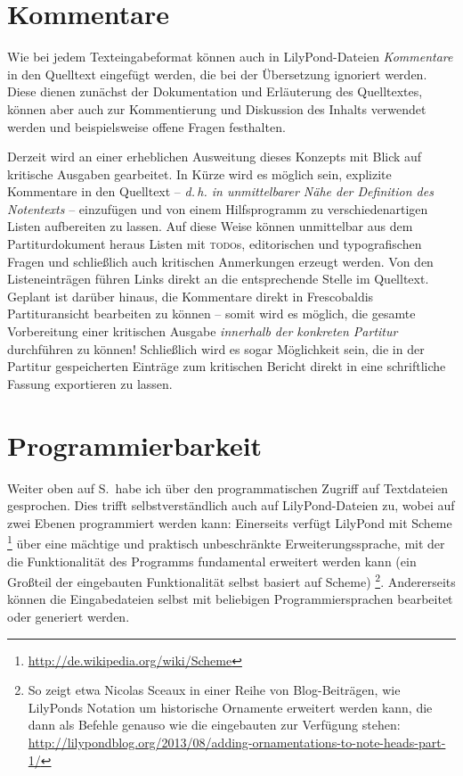\documentclass[DIV=12]{scrreprt}
\begin{document}
\section{Kommentare}
\label{sec:pt_lilypond-comments}
Wie bei jedem Texteingabeformat können auch in LilyPond-Dateien \emph{Kommentare} in den Quelltext eingefügt werden, die bei der Übersetzung ignoriert werden.
Diese dienen zunächst der Dokumentation und Erläuterung des Quelltextes, können aber auch zur Kommentierung und Diskussion des Inhalts verwendet werden und beispielsweise offene Fragen festhalten.

Derzeit wird an einer erheblichen Ausweitung dieses Konzepts mit Blick auf kritische Ausgaben gearbeitet.
In Kürze wird es möglich sein, explizite Kommentare in den Quelltext -- \emph{d.\,h. in unmittelbarer Nähe der Definition des Notentexts} -- einzufügen und von einem Hilfsprogramm zu verschiedenartigen Listen aufbereiten zu lassen.
Auf diese Weise können unmittelbar aus dem Partiturdokument heraus Listen mit \textsc{todo}s, editorischen und typografischen Fragen und schließlich auch kritischen Anmerkungen erzeugt werden.
Von den Listeneinträgen führen Links direkt an die entsprechende Stelle im Quelltext.
Geplant ist darüber hinaus, die Kommentare direkt in Frescobaldis Partituransicht bearbeiten zu können -- somit wird es möglich, die gesamte Vorbereitung einer kritischen Ausgabe \emph{innerhalb der konkreten Partitur} durchführen zu können!
Schließlich wird es sogar Möglichkeit sein, die in der Partitur gespeicherten Einträge zum kritischen Bericht direkt in eine schriftliche Fassung exportieren zu lassen.

\section{Programmierbarkeit}
\label{sec:pt_lilypond-programmability}
Weiter oben auf S.\,\pageref{sec:pt_programmability} habe ich über den programmatischen Zugriff auf Textdateien gesprochen.
Dies trifft selbstverständlich auch auf LilyPond-Dateien zu, wobei auf zwei Ebenen programmiert werden kann:
Einerseits verfügt LilyPond mit Scheme%
\footnote{\url{http://de.wikipedia.org/wiki/Scheme}}
über eine mächtige und praktisch unbeschränkte Erweiterungssprache, mit der die Funktionalität des Programms fundamental erweitert werden kann (ein Großteil der eingebauten Funktionalität selbst basiert auf Scheme)%
\footnote{So zeigt etwa Nicolas Sceaux in einer Reihe von Blog-Beiträgen, wie LilyPonds Notation um historische Ornamente erweitert werden kann, die dann als Befehle genauso wie die eingebauten zur Verfügung stehen: \url{http://lilypondblog.org/2013/08/adding-ornamentations-to-note-heads-part-1/}}.
Andererseits können die Eingabedateien selbst mit beliebigen Programmiersprachen bearbeitet oder generiert werden.
\end{document}
